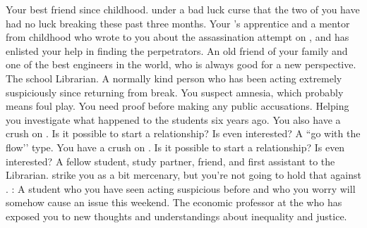 \documentclass[char]{GL2020}
\begin{document}
\begin{contacts}
    \contact{\cInitiate{}} Your best friend since childhood. \cInitiate{\Theyare} under a bad luck curse that the two of you have had no luck breaking these past three months.
    \contact{\cJuniorStatesman{}} Your \cHeadDiplomat{\Auncle} \cHeadDiplomat{}'s apprentice and a mentor from childhood who wrote to you about the assassination attempt on \cHeadDiplomat{}, and has enlisted your help in finding the perpetrators.   
    \contact {\cBunker{}} An old friend of your family and one of the best engineers in the world, who is always good for a new perspective.
    \contact{\cLibrarian{}} The school Librarian. A normally kind person who has been acting extremely suspiciously since returning from break. You suspect amnesia, which probably means foul play. You need proof before making any public accusations.
    \contact{\cHeir{}} Helping you investigate what happened to the students six years ago. You also have a crush on \cHeir{\them}. Is it possible to start a relationship? Is \cHeir{} even interested?
    \contact{\cChupStudent{}} A ``go with the flow’’ type. You have a crush on \cChupStudent{\them}. Is it possible to start a relationship? Is \cChupStudent{} even interested?
    \contact{\cLibAssist{}} A fellow student, study partner, friend, and first assistant to the Librarian. \cLibAssist{\They} strike\cLibAssist{\verbs} you as a bit mercenary, but you're not going to hold that against \cLibAssist{\them}.
\contact{\cPirateChild{}}: A \pShippie{} student who you have seen acting suspicious before and who you worry will somehow cause an issue this weekend.  
    \contact{\cChupSecond{}} The economic professor at the \pSchool{} who has exposed you to new thoughts and understandings about inequality and justice.

\end{contacts}
\end{document}
